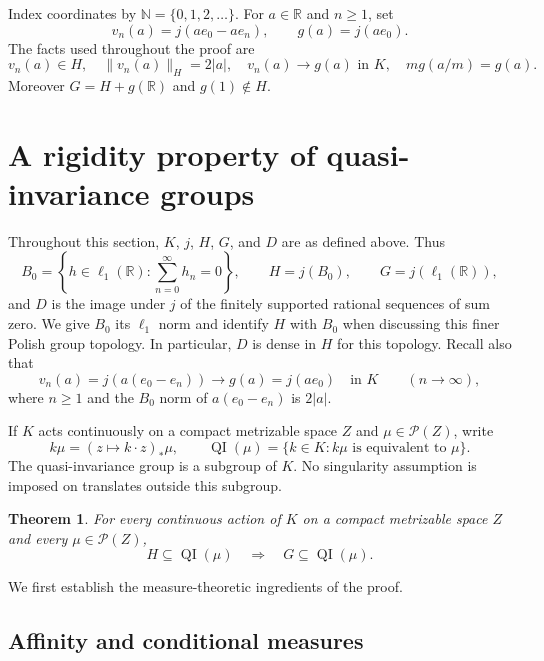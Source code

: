 \documentclass[11pt]{article}
\newtheorem{theorem}{Theorem}[section]
\theoremstyle{definition}
\newcommand{\N}{\mathbb N}
\newcommand{\R}{\mathbb R}
\newcommand{\Prob}{\mathcal P}
\newcommand{\QI}{\operatorname{QI}}
\begin{document}
Index coordinates by $\N=\{0,1,2,\ldots\}$. For $a\in\R$ and $n\ge1$,
set
\begin{equation}\label{eq:vn}
 v_n(a)=j(ae_0-ae_n),\qquad g(a)=j(ae_0).
\end{equation}
The facts used throughout the proof are
\begin{equation}\label{eq:group-facts}
 v_n(a)\in H,\quad \|v_n(a)\|_H=2|a|,\quad
 v_n(a)\longrightarrow g(a)\text{ in }K,\quad
 mg(a/m)=g(a).
\end{equation}
Moreover $G=H+g(\R)$ and $g(1)\notin H$.

\section{A rigidity property of quasi-invariance groups}
\label{sec:measure-obstruction}

Throughout this section, $K$, $j$, $H$, $G$, and $D$ are as defined
above. Thus
\[
 B_0=\left\{h\in\ell_1(\R):\sum_{n=0}^{\infty}h_n=0\right\},
 \qquad H=j(B_0),\qquad G=j(\ell_1(\R)),
\]
and $D$ is the image under $j$ of the finitely supported rational
sequences of sum zero. We give $B_0$ its $\ell_1$ norm and identify $H$
with $B_0$ when discussing this finer Polish group topology. In
particular, $D$ is dense in $H$ for this topology. Recall also that
\[
 v_n(a)=j(a(e_0-e_n))\longrightarrow g(a)=j(ae_0)
 \quad\text{in }K\qquad(n\longrightarrow\infty),
\]
where $n\geq1$ and the $B_0$ norm of $a(e_0-e_n)$ is $2|a|$.

If $K$ acts continuously on a compact metrizable space $Z$ and
$\mu\in\Prob(Z)$, write
\[
 k\mu=(z\mapsto k\cdot z)_*\mu,
 \qquad
 \QI(\mu)=\{k\in K:k\mu\text{ is equivalent to }\mu\}.
\]
The quasi-invariance group is a subgroup of $K$. No singularity
assumption is imposed on translates outside this subgroup.

\begin{theorem}\label{thm:rigidity}
For every continuous action of $K$ on a compact metrizable space $Z$
and every $\mu\in\Prob(Z)$,
\[
 H\subseteq\QI(\mu)\quad\Longrightarrow\quad G\subseteq\QI(\mu).
\]
\end{theorem}

We first establish the measure-theoretic ingredients of the proof.

\subsection{Affinity and conditional measures}
\end{document}
